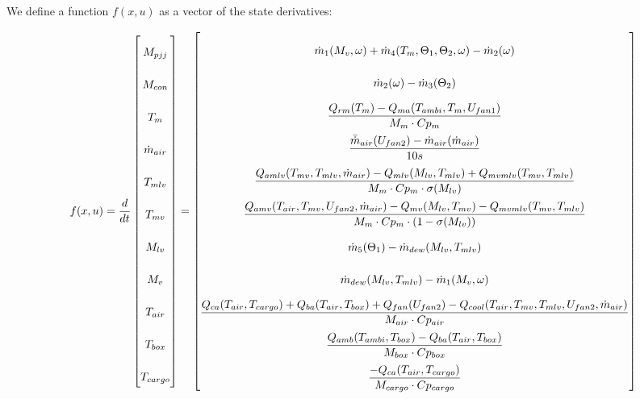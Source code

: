 We define a function $f(x,u)$ as a vector of the state derivatives:

\begin{equation} \label{eq:f_noSub} \renewcommand{\arraystretch}{2.4}
	f(x,u) =  \dfrac{d}{dt} \begin{bmatrix}
		M_{pjj}			\\				%
		M_{con} 		\\				%
		T_m 			\\				%
		\dot{m}_{air}	\\				%
		T_{mlv}			\\				%
		T_{mv}			\\				%
		M_{lv}			\\				%
		M_v				\\				%
		T_{air}			\\				%
		T_{box}			\\				%
		T_{cargo}		\\				%

	\end{bmatrix}
	=
	\begin{bmatrix}
		\dot{m}_1(M_{v}, \omega) + \dot{m}_4(T_m,\Theta_1,\Theta_2,\omega) - \dot{m}_2(\omega) \\										%
		\dot{m}_{2}(\omega) - \dot{m}_{3}(\Theta_2)	\\												%
		\dfrac{Q_{rm}(T_m) - Q_{ma}(T_{ambi}, T_m, U_{fan1})}{M_m \cdot Cp_m} \\									%
		\dfrac{\bar{\dot{m}}_{air}(U_{fan2})  - \dot{m}_{air}(\dot{m}_{air})} {10s}		\\					%
		\dfrac{Q_{amlv}(T_{mv},T_{mlv},\dot{m}_{air})-Q_{mlv}(M_{lv},T_{mlv}) + Q_{mvmlv}(T_{mv},T_{mlv})}{M_m \cdot Cp_m \cdot \sigma(M_{lv})}        \\	%
		\dfrac{Q_{amv}(T_{air},T_{mv},U_{fan2},\dot{m}_{air}) - Q_{mv}(M_{lv},T_{mv}) - Q_{mvmlv}(T_{mv},T_{mlv})}{M_m \cdot Cp_m \cdot (1- \sigma(M_{lv}))}	\\	%
		\dot{m}_{5}(\Theta_1) - \dot{m}_{dew}(M_{lv},T_{mlv})		\\											%
		\dot{m}_{dew}(M_{lv},T_{mlv}) - \dot{m}_1(M_{v}, \omega)	\\												%
		\dfrac{Q_{ca}(T_{air},T_{cargo}) + Q_{ba}(T_{air},T_{box}) + Q_{fan}(U_{fan2}) - Q_{cool}(T_{air},T_{mv},T_{mlv},U_{fan2},\dot{m}_{air})}{M_{air} \cdot Cp_{air}} \\		%
		\dfrac{Q_{amb}(T_{ambi},T_{box}) -  Q_{ba}(T_{air},T_{box})}{M_{box} \cdot Cp_{box}} \\							%
		\dfrac{-Q_{ca}(T_{air},T_{cargo})}{M_{cargo} \cdot Cp_{cargo}}									%
	\end{bmatrix}
\end{equation} 

